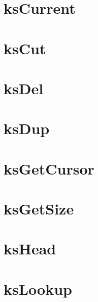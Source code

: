\let\mypdfximage\pdfximage\def\pdfximage{\immediate\mypdfximage}\documentclass[twoside]{book}
\newcommand{\+}{\discretionary{\mbox{\scriptsize$\hookleftarrow$}}{}{}}
\begin{document}
\chapter{ks\+Current}
\label{doc_contrib_api_reviews_core_ksCurrent_md}

\chapter{ks\+Cut}
\label{doc_contrib_api_reviews_core_ksCut_md}

\chapter{ks\+Del}
\label{doc_contrib_api_reviews_core_ksDel_md}

\chapter{ks\+Dup}
\label{doc_contrib_api_reviews_core_ksDup_md}

\chapter{ks\+Get\+Cursor}
\label{doc_contrib_api_reviews_core_ksGetCursor_md}

\chapter{ks\+Get\+Size}
\label{doc_contrib_api_reviews_core_ksGetSize_md}

\chapter{ks\+Head}
\label{doc_contrib_api_reviews_core_ksHead_md}

\chapter{ks\+Lookup}
\label{doc_contrib_api_reviews_core_ksLookup_md}

\end{document}
